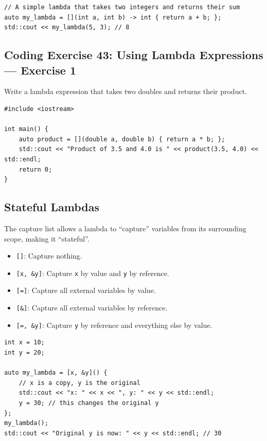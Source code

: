 \begin{lstlisting}
// A simple lambda that takes two integers and returns their sum
auto my_lambda = [](int a, int b) -> int { return a + b; };
std::cout << my_lambda(5, 3); // 8
\end{lstlisting}

\subsection{Coding Exercise 43: Using Lambda Expressions --- Exercise 1}
Write a lambda expression that takes two doubles and returns their product.
\begin{lstlisting}
#include <iostream>

int main() {
	auto product = [](double a, double b) { return a * b; };
	std::cout << "Product of 3.5 and 4.0 is " << product(3.5, 4.0) << std::endl;
	return 0;
}
\end{lstlisting}

\subsection{Stateful Lambdas}
The capture list allows a lambda to ``capture'' variables from its surrounding scope, making it ``stateful''.
\begin{itemize}
    \item \texttt{[]}: Capture nothing.
    \item \texttt{[x, \&y]}: Capture \texttt{x} by value and \texttt{y} by reference.
    \item \texttt{[=]}: Capture all external variables by value.
    \item \texttt{[\&]}: Capture all external variables by reference.
    \item \texttt{[=, \&y]}: Capture \texttt{y} by reference and everything else by value.
\end{itemize}
\begin{lstlisting}
int x = 10;
int y = 20;

auto my_lambda = [x, &y]() {
	// x is a copy, y is the original
	std::cout << "x: " << x << ", y: " << y << std::endl;
	y = 30; // this changes the original y
};
my_lambda();
std::cout << "Original y is now: " << y << std::endl; // 30
\end{lstlisting}

